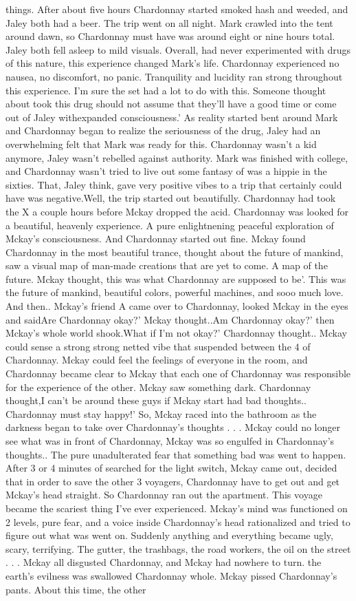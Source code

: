 \documentclass[12pt]{book}
\begin{document}
things. After about five hours Chardonnay started smoked hash and weeded, and Jaley both had a beer. The trip went on all night. Mark crawled into the tent around dawn, so Chardonnay must have was around eight or nine hours total. Jaley both fell asleep to mild visuals. Overall, had never experimented with drugs of this nature, this experience changed Mark's life. Chardonnay experienced no nausea, no discomfort, no panic. Tranquility and lucidity ran strong throughout this experience. I'm sure the set had a lot to do with this. Someone thought about took this drug should not assume that they'll have a good time or come out of Jaley withexpanded consciousness.' As reality started bent around Mark and Chardonnay began to realize the seriousness of the drug, Jaley had an overwhelming felt that Mark was ready for this. Chardonnay wasn't a kid anymore, Jaley wasn't rebelled against authority. Mark was finished with college, and Chardonnay wasn't tried to live out some fantasy of was a hippie in the sixties. That, Jaley think, gave very positive vibes to a trip that certainly could have was negative.Well, the trip started out beautifully. Chardonnay had took the X a couple hours before Mckay dropped the acid. Chardonnay was looked for a beautiful, heavenly experience. A pure enlightnening peaceful exploration of Mckay's consciousness. And Chardonnay started out fine. Mckay found Chardonnay in the most beautiful trance, thought about the future of mankind, saw a visual map of man-made creations that are yet to come. A map of the future. Mckay thought, this was what Chardonnay are supposed to be'. This was the future of mankind, beautiful colors, powerful machines, and sooo much love. And then.. Mckay's friend A came over to Chardonnay, looked Mckay in the eyes and saidAre Chardonnay okay?' Mckay thought..Am Chardonnay okay?' then Mckay's whole world shook.What if I'm not okay?' Chardonnay thought.. Mckay could sense a strong strong netted vibe that suspended between the 4 of Chardonnay. Mckay could feel the feelings of everyone in the room, and Chardonnay became clear to Mckay that each one of Chardonnay was responsible for the experience of the other. Mckay saw something dark. Chardonnay thought,I can't be around these guys if Mckay start had bad thoughts.. Chardonnay must stay happy!' So, Mckay raced into the bathroom as the darkness began to take over Chardonnay's thoughts . . .  Mckay could no longer see what was in front of Chardonnay, Mckay was so engulfed in Chardonnay's thoughts.. The pure unadulterated fear that something bad was went to happen. After 3 or 4 minutes of searched for the light switch, Mckay came out, decided that in order to save the other 3 voyagers, Chardonnay have to get out and get Mckay's head straight. So Chardonnay ran out the apartment. This voyage became the scariest thing I've ever experienced. Mckay's mind was functioned on 2 levels, pure fear, and a voice inside Chardonnay's head rationalized and tried to figure out what was went on. Suddenly anything and everything became ugly, scary, terrifying. The gutter, the trashbags, the road workers, the oil on the street . . .  Mckay all disgusted Chardonnay, and Mckay had nowhere to turn. the earth's evilness was swallowed Chardonnay whole. Mckay pissed Chardonnay's pants. About this time, the other 
\end{document}
